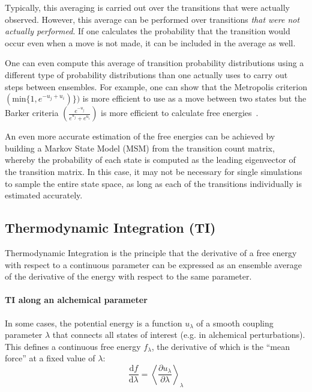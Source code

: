 \documentclass[9pt,review]{livecoms}
\begin{document}
Typically, this averaging is carried out over the transitions that were actually observed. However, this average can be performed over transitions \emph{that were not actually performed}. If one calculates the probability that the transition would occur even when a move is not made, it can be included in the average as well. 

One can even compute this average of transition probability distributions using a different type of  probability distributions than one actually uses to carry out steps between ensembles. For example, one can show that the Metropolis criterion $(\mathrm{min} \{1,e^{-u_j+u_i})\})$ is more efficient to use as a move between two states but the Barker criteria $\left(\frac{e^{-u_j}}{e^{u_j}+e^{u_i}}\right)$ is more efficient to calculate free energies~\citep{Liu:Biometrika:1996}.

An even more accurate estimation of the free energies can be achieved by building a Markov State Model (MSM) from the transition count matrix, whereby the probability of each state is computed as the leading eigenvector of the transition matrix. In this case, it may not be necessary for single simulations to sample the entire state space, as long as each of the transitions individually is estimated accurately. 

\subsection{Thermodynamic Integration (TI)}
\label{sec:fe_estimators:TI}

Thermodynamic Integration is the principle that the derivative of a free energy with respect to a continuous parameter can be expressed as an ensemble average of the derivative of the energy with respect to the same parameter.

\paragraph{TI along an alchemical parameter} In some cases, the potential energy is a function $u_\lambda$ of a smooth coupling parameter $\lambda$ that connects all states of interest (e.g. in alchemical perturbations).
This defines a continuous free energy $f_\lambda$, the derivative of which is the ``mean force'' at a fixed value of $\lambda$:
\begin{equation}
\frac{\mathrm{d}f}{\mathrm{d}\lambda} =\left\langle \frac{\partial u_\lambda}{\partial \lambda} \right\rangle_\lambda
\label{eq:TI1}
\end{equation}
\end{document}
